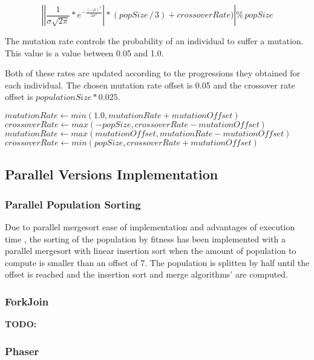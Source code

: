 \documentclass[runningheads]{llncs}
\begin{document}
\[ \left |\left | \frac{1}{\sigma \sqrt{2\pi}}*e^{-\frac{(-\mu)^2}{2\sigma^2}} \right | * (popSize\,/\,3) + crossoverRate)  \right | \%  \, popSize \]	

The mutation rate controls the probability of an individual to suffer a mutation. This value is a value between 0.05 and 1.0.

Both of these rates are updated according to the progressions they obtained for each individual. The chosen mutation rate offset is 0.05 and the crossover rate offset is \(populationSize * 0.025\).

\begin{algorithmic}
        \State $mutationRate \gets min(1.0, mutationRate + mutationOffset)$
        \State $crossoverRate \gets max(-popSize, crossoverRate - mutationOffset)$
\EndIf
{}
        \State $mutationRate \gets max(mutationOffset, mutationRate - mutationOffset)$
        \State $crossoverRate \gets min(popSize, crossoverRate + mutationOffset)$
\EndIf
\end{algorithmic}

\subsection{Parallel Versions Implementation}
\subsubsection{Parallel Population Sorting} \hfill \par
Due to parallel mergesort ease of implementation and advantages of execution time \cite{analysisMergeSort}, the sorting of the population by fitness has been implemented with a parallel mergesort with linear insertion sort when the amount of population to compute is smaller than an offset of 7. The population is splitten by half until the offset is reached and the insertion sort and merge algorithms' are computed.


\subsubsection{ForkJoin} \hfill \par
\textbf{TODO:}

\subsubsection{Phaser} \hfill \par
\end{document}
